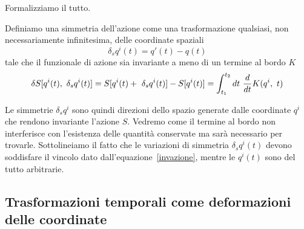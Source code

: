     Formalizziamo il tutto.

    \begin{definition}
        Definiamo una simmetria dell'azione come una trasformazione qualsiasi, non necessariamente infinitesima, delle coordinate spaziali 
    \begin{equation}\label{simmazione}
        \delta_s q^i(t) = q'(t) - q(t)
    \end{equation} 
        tale che il funzionale di azione sia invariante a meno di un termine al bordo $K$
    \begin{equation} \label{invazione}
        \delta S[q^i(t), ~\delta_s q^i(t)] = S[q^i(t) + ~\delta_s q^i(t)] - S[q^i(t)] = \int_{t_1}^{t_2}dt~ \frac{d}{dt} K(q^i, ~t)
    \end{equation}
    \end{definition}    
    Le simmetrie $\delta_s q^i$ sono quindi direzioni dello spazio generate dalle coordinate $q^i$ che rendono invariante l'azione $S$. Vedremo come il termine al bordo non interferisce con l'esistenza delle quantità conservate ma sarà necessario per trovarle. Sottolineiamo il fatto che le variazioni di simmetria $\delta_s q^i(t)$ devono soddisfare il vincolo dato dall'equazione~\eqref{invazione}, mentre le $q^i(t)$ sono del tutto arbitrarie.

\subsection{Trasformazioni temporali come deformazioni delle coordinate}

